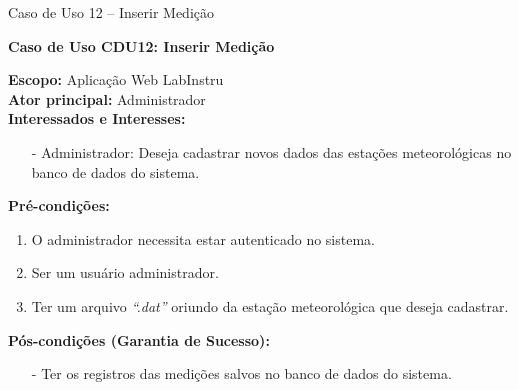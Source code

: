 \begin{quadro}[h!]\caption{Caso de Uso 12 --  Inserir Medição}
\hfill
\end{quadro}
	\begin{mdframed}

		\textbf{Caso de Uso CDU12: Inserir Medição}\\

		\begin{flushleft}

		\textbf{Escopo:} Aplicação Web LabInstru\\

		\textbf{Ator principal:} Administrador\\

		\textbf{Interessados e Interesses:}
		\begin{itemize}
			\item[-] Administrador: Deseja cadastrar novos dados das estações meteorológicas no banco de dados do sistema.
		\end{itemize}

		\textbf{Pré-condições:}\\
			 \begin{enumerate}
			 	\item{O administrador necessita estar autenticado no sistema.}
			 	\item{Ser um usuário administrador}.
				\item Ter um arquivo \textit{``.dat''} oriundo da estação meteorológica que deseja cadastrar.
			 \end{enumerate}

		\textbf{Pós-condições (Garantia de Sucesso):}
		\begin{itemize}
			\item[-] Ter os registros das medições salvos no banco de dados do sistema.
		\end{itemize}



\end{flushleft}
\end{mdframed}
